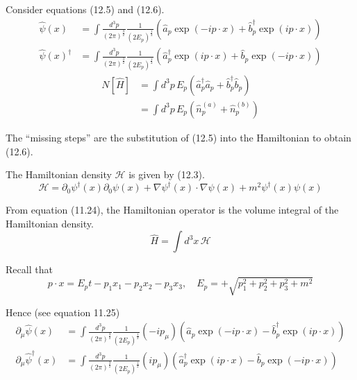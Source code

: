 


\bigskip
Consider equations (12.5) and (12.6).
\begin{equation*}
\begin{aligned}
\hat\psi(x)&=\int\frac{d^3p}{(2\pi)^\frac{3}{2}}\frac{1}{(2E_p)^\frac{1}{2}}
\left(\hat a_p\exp(-ip\cdot x)+\hat b_p^\dag\exp(ip\cdot x)\right)
\\
\hat\psi(x)^\dag&=\int\frac{d^3p}{(2\pi)^\frac{3}{2}}\frac{1}{(2E_p)^\frac{1}{2}}
\left(\hat a_p^\dag\exp(ip\cdot x)+\hat b_p\exp(-ip\cdot x)\right)
\end{aligned}
\tag{12.5}
\end{equation*}
\begin{equation*}
\begin{aligned}
N[\hat H]&=\int d^3p\,E_p\left(\hat a_p^\dag\hat a_p+\hat b_p^\dag\hat b_p\right)
\\
&=\int d^3p\,E_p\left(\hat n_p^{(a)}+\hat n_p^{(b)}\right)
\end{aligned}
\tag{12.6}
\end{equation*}

The ``missing steps'' are the substitution of (12.5) into the Hamiltonian to obtain (12.6).

\bigskip
The Hamiltonian density $\mathcal H$ is given by (12.3).
\begin{equation*}
\mathcal H=\partial_0\psi^\dag(x)\partial_0\psi(x)+\nabla\psi^\dag(x)\cdot\nabla\psi(x)+m^2\psi^\dag(x)\psi(x)
\tag{12.3}
\end{equation*}

From equation (11.24), the Hamiltonian operator is the volume integral of the Hamiltonian density.
\begin{equation*}
\hat H=\int d^3x\,\mathcal H
\end{equation*}

Recall that
\begin{equation*}
p\cdot x=E_pt-p_1x_1-p_2x_2-p_3x_3,\quad E_p=+\sqrt{p_1^2+p_2^2+p_3^2+m^2}
\end{equation*}

Hence (see equation 11.25)
\begin{equation*}
\begin{aligned}
\partial_\mu\hat\psi(x)
&=\int\frac{d^3p}{(2\pi)^\frac{3}{2}}\frac{1}{(2E_p)^\frac{1}{2}}(-ip_\mu)
\left(\hat a_p\exp(-ip\cdot x)-\hat b_p^\dag\exp(ip\cdot x)\right)
\\
\partial_\mu\hat\psi^\dag(x)
&=\int\frac{d^3p}{(2\pi)^\frac{3}{2}}\frac{1}{(2E_p)^\frac{1}{2}}(ip_\mu)
\left(\hat a_p^\dag\exp(ip\cdot x)-\hat b_p\exp(-ip\cdot x)\right)
\end{aligned}
\end{equation*}

